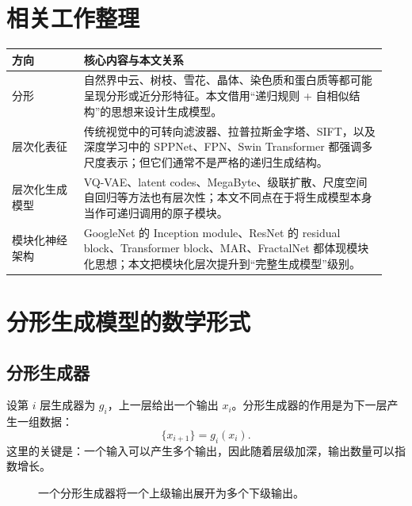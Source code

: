 \documentclass[UTF8,11pt,a4paper]{ctexart}
\begin{document}
\section{相关工作整理}

\begin{longtable}{p{0.18\linewidth}p{0.76\linewidth}}
\toprule
\textbf{方向} & \textbf{核心内容与本文关系}\\
\midrule
分形 & 自然界中云、树枝、雪花、晶体、染色质和蛋白质等都可能呈现分形或近分形特征。本文借用“递归规则 + 自相似结构”的思想来设计生成模型。\\
层次化表征 & 传统视觉中的可转向滤波器、拉普拉斯金字塔、SIFT，以及深度学习中的 SPPNet、FPN、Swin Transformer 都强调多尺度表示；但它们通常不是严格的递归生成结构。\\
层次化生成模型 & VQ-VAE、latent codes、MegaByte、级联扩散、尺度空间自回归等方法也有层次性；本文不同点在于将生成模型本身当作可递归调用的原子模块。\\
模块化神经架构 & GoogleNet 的 Inception module、ResNet 的 residual block、Transformer block、MAR、FractalNet 都体现模块化思想；本文把模块化层次提升到“完整生成模型”级别。\\
\bottomrule
\end{longtable}

\section{分形生成模型的数学形式}\label{sec:math}

\subsection{分形生成器}

设第 $i$ 层生成器为 $g_i$，上一层给出一个输出 $x_i$。分形生成器的作用是为下一层产生一组数据：
\begin{equation}
    \{x_{i+1}\}=g_i(x_i).
\end{equation}
这里的关键是：一个输入可以产生多个输出，因此随着层级加深，输出数量可以指数增长。

\begin{figure}[H]
\centering
{}
\caption{一个分形生成器将一个上级输出展开为多个下级输出。}
\end{figure}
\end{document}
